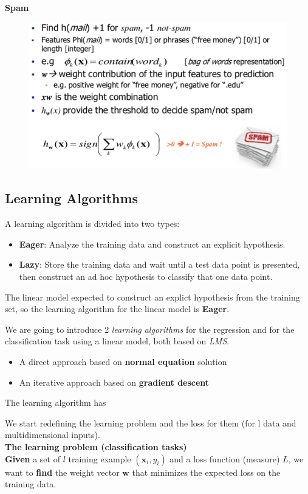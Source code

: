 \documentclass[../main.tex]{subfiles}
\begin{document}
\textbf{Spam}
\begin{figure}[H]
    \centering
    \includegraphics[scale = 0.4]{lectures/2_linear_model/2_example_clas_2.png}
\end{figure}



\newpage
\subsection{Learning Algorithms}
A learning algorithm is divided into two types:
\begin{itemize}
    \item \textbf{Eager}: Analyze the training data and construct an explicit hypothesis.
    \item \textbf{Lazy}: Store the training data and wait until a test data point is presented, then construct an ad hoc hypothesis to classify that one data point.
\end{itemize}
The linear model expected to construct an explict hypothesis from the training set, so the learning algorithm for the linear model is \textbf{Eager}.

We are going to introduce 2 \emph{learning algorithms} for the regression and for the classification task using a linear model, both based on \emph{LMS}.
\begin{itemize}
    \item A direct approach based on \textbf{normal equation} solution
    \item An iterative approach based on \textbf{gradient descent}
\end{itemize}
The learning algorithm has 


We start redefining the learning problem and the loss for them (for l data and multidimensional inputs).\\
\newline
\textbf{The learning problem (classification tasks)}\\
\textbf{Given} a set of $l$ training example $( \mathbf{x}_i, y_i)$ and a loss function (measure) $L$, we want to \textbf{find} the weight vector $\textbf{w}$ that minimizes the expected loss on the training data.
\end{document}
